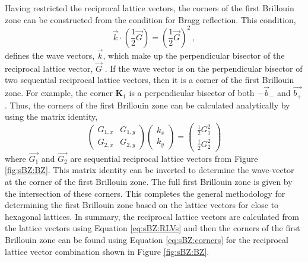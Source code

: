 Having restricted the reciprocal lattice vectors, the corners of the first Brillouin zone can be constructed from the condition for Bragg reflection.
This condition,
\begin{equation*}
	\vec{k} \cdot \left(\frac{1}{2} \vec{G} \right)=\left(\frac{1}{2} \vec{G}\right)^2 \ ,
\end{equation*}
defines the wave vectors, $\vec{k}$, which make up the perpendicular bisector of the reciprocal lattice vector, $\vec{G}$ \cite{Kittel2005}.
If the wave vector is on the perpendicular bisector of two sequential reciprocal lattice vectors, then it is a corner of the first Brillouin zone.
For example, the corner $\bm{K}_1$ is a perpendicular bisector of both $-\vec{b}_-$ and $\vec{b_+}$.
Thus, the corners of the first Brillouin zone can be calculated analytically by using the matrix identity,
\begin{equation}
	\left(\begin{array}{cc}
		G_{1,x} & G_{1,y} \\
		G_{2,x} & G_{2,y} \end{array} \right)
	\left(\begin{array}{c} k_x \\ k_y \end{array} \right)
	=
	\left( \begin{array}{c} \frac{1}{2} G_1^2 \\ \frac{1}{2} G_2^2 \end{array} \right)
	\label{eq:sBZ:corners}
\end{equation}
where $\vec{G_1}$ and $\vec{G_2}$ are sequential reciprocal lattice vectors from Figure \ref{fig:sBZ:BZ}.
This matrix identity can be inverted to determine the wave-vector at the corner of the first Brillouin zone.
The full first Brillouin zone is given by the intersection of these corners.
This completes the general methodology for determining the first Brillouin zone based on the lattice vectors for close to hexagonal lattices.
In summary, the reciprocal lattice vectors are calculated from the lattice vectors using Equation \ref{eq:sBZ:RLVs} and then the corners of the first Brillouin zone can be found using Equation \ref{eq:sBZ:corners} for the reciprocal lattice vector combination shown in Figure \ref{fig:sBZ:BZ}.

